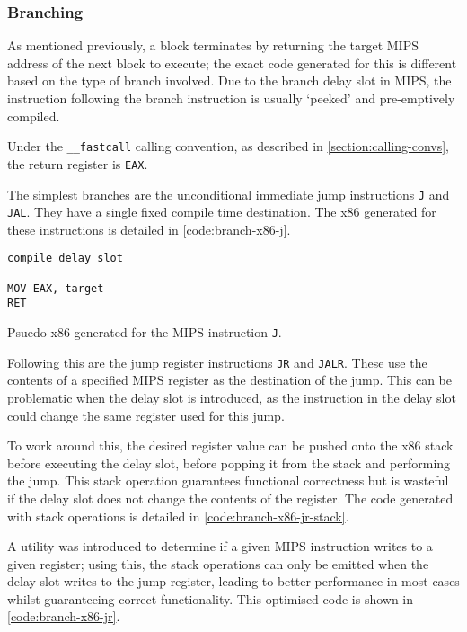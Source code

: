 \subsubsection{Branching}

As mentioned previously, a block terminates by returning the target MIPS address of the next block to execute; the exact code generated for this is different based on the type of branch involved. Due to the branch delay slot in MIPS, the instruction following the branch instruction is usually `peeked' and pre-emptively compiled.

Under the \texttt{\_\_fastcall} calling convention, as described in \autoref{section:calling-convs}, the return register is \texttt{EAX}.

The simplest branches are the unconditional immediate jump instructions \texttt{J} and \texttt{JAL}. They have a single fixed compile time destination. The x86 generated for these instructions is detailed in \autoref{code:branch-x86-j}.

\begin{lstfloat}[H]
    \begin{lstlisting}
compile delay slot

MOV EAX, target
RET
    \end{lstlisting}
    \caption{Psuedo-x86 generated for the MIPS instruction \texttt{J}.}
    \label{code:branch-x86-j}
\end{lstfloat}

Following this are the jump register instructions \texttt{JR} and \texttt{JALR}. These use the contents of a specified MIPS register as the destination of the jump. This can be problematic when the delay slot is introduced, as the instruction in the delay slot could change the same register used for this jump.

To work around this, the desired register value can be pushed onto the x86 stack before executing the delay slot, before popping it from the stack and performing the jump. This stack operation guarantees functional correctness but is wasteful if the delay slot does not change the contents of the register. The code generated with stack operations is detailed in \autoref{code:branch-x86-jr-stack}.

A utility was introduced to determine if a given MIPS instruction writes to a given register; using this, the stack operations can only be emitted when the delay slot writes to the jump register, leading to better performance in most cases whilst guaranteeing correct functionality. This optimised code is shown in \autoref{code:branch-x86-jr}.

